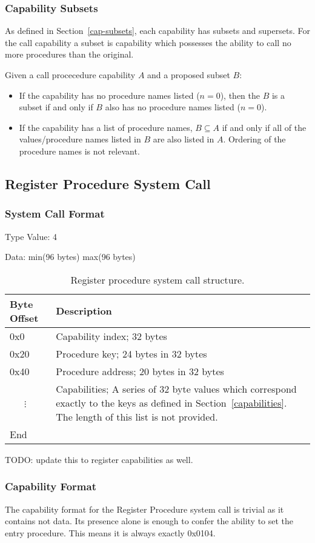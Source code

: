 \documentclass[english,a4paper]{article}
\let\oldparagraph\subsubsection
\renewcommand{\subsubsection}[1]{\oldparagraph{#1}\mbox{}}
\begin{document}
\subsubsection{Capability Subsets}
As defined in Section~\ref{cap-subsets}, each capability has subsets and
supersets. For the call capability a subset is capability which possesses the
ability to call no more procedures than the original.

Given a call procecedure capability $A$ and a proposed subset $B$:
\begin{itemize}
  \item If the capability has no procedure names listed ($n=0$), then the $B$ is
  a subset if and only if $B$ also has no procedure names listed ($n=0$).
  \item If the capability has a list of procedure names, $B \subseteq A$ if and
  only if all of the values/procedure names listed in $B$ are also listed in
  $A$. Ordering of the procedure names is not relevant.
\end{itemize}

\subsection{Register Procedure System Call}

\subsubsection{System Call Format}
Type Value: 4

Data: min(96 bytes) max(96 bytes)

\begin{table}[H]
  \caption{Register procedure system call structure.}
  \centering{}%
  \begin{tabular}{l|p{}}
    \hline
    Byte Offset & Description\tabularnewline
    \hline
    \hline
    0x0 & Capability index; 32 bytes \tabularnewline
    0x20 & Procedure key; 24 bytes in 32 bytes \tabularnewline
    0x40 & Procedure address; 20 bytes in 32 bytes \tabularnewline
    ~~~$\vdots$ & Capabilities; A series of 32 byte values which correspond
    exactly to the keys as defined in Section~\ref{capabilities}. The length of
    this list is not provided. \tabularnewline
    \hline
    End &  \tabularnewline
    \hline
  \end{tabular}
\end{table}
TODO: update this to register capabilities as well.

\subsubsection{Capability Format}
The capability format for the Register Procedure system call is trivial as it
contains not data. Its presence alone is enough to confer the ability to set the
entry procedure. This means it is always exactly 0x0104.
\end{document}
